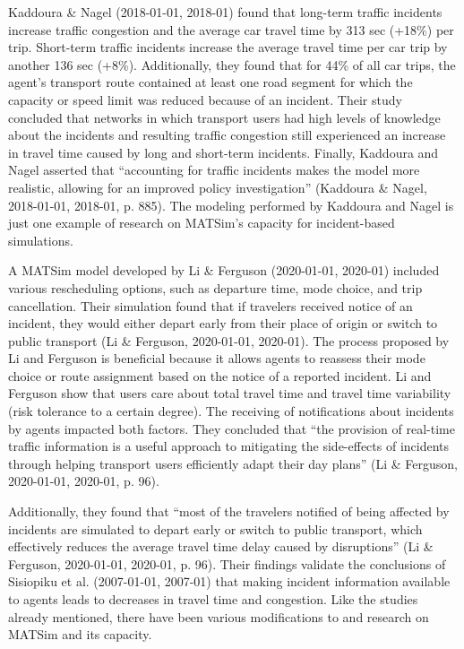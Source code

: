 \documentclass[fancy, oneside, mastersfancy, ms]{byuthesis}
\begin{document}
Kaddoura \& Nagel (2018-01-01, 2018-01) found that long-term traffic
incidents increase traffic congestion and the average car travel time by
313 sec (+18\%) per trip. Short-term traffic incidents increase the
average travel time per car trip by another 136 sec (+8\%).
Additionally, they found that for 44\% of all car trips, the agent's
transport route contained at least one road segment for which the
capacity or speed limit was reduced because of an incident. Their study
concluded that networks in which transport users had high levels of
knowledge about the incidents and resulting traffic congestion still
experienced an increase in travel time caused by long and short-term
incidents. Finally, Kaddoura and Nagel asserted that ``accounting for
traffic incidents makes the model more realistic, allowing for an
improved policy investigation'' (Kaddoura \& Nagel, 2018-01-01, 2018-01,
p. 885). The modeling performed by Kaddoura and Nagel is just one
example of research on MATSim's capacity for incident-based simulations.

A MATSim model developed by Li \& Ferguson (2020-01-01, 2020-01)
included various rescheduling options, such as departure time, mode
choice, and trip cancellation. Their simulation found that if travelers
received notice of an incident, they would either depart early from
their place of origin or switch to public transport (Li \& Ferguson,
2020-01-01, 2020-01). The process proposed by Li and Ferguson is
beneficial because it allows agents to reassess their mode choice or
route assignment based on the notice of a reported incident. Li and
Ferguson show that users care about total travel time and travel time
variability (risk tolerance to a certain degree). The receiving of
notifications about incidents by agents impacted both factors. They
concluded that ``the provision of real-time traffic information is a
useful approach to mitigating the side-effects of incidents through
helping transport users efficiently adapt their day plans'' (Li \&
Ferguson, 2020-01-01, 2020-01, p. 96).

Additionally, they found that ``most of the travelers notified of being
affected by incidents are simulated to depart early or switch to public
transport, which effectively reduces the average travel time delay
caused by disruptions'' (Li \& Ferguson, 2020-01-01, 2020-01, p. 96).
Their findings validate the conclusions of Sisiopiku et al. (2007-01-01,
2007-01) that making incident information available to agents leads to
decreases in travel time and congestion. Like the studies already
mentioned, there have been various modifications to and research on
MATSim and its capacity.
\end{document}

